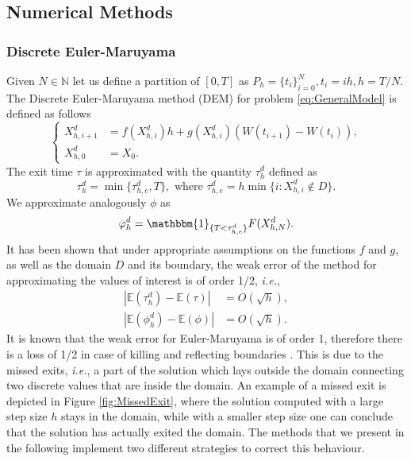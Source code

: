 \subsection{Numerical Methods}

\subsubsection{Discrete Euler-Maruyama}
Given $N \in \mathbb{N}$ let us define a partition of $[0,T]$ as $P_h = \{t_i\}_{i=0}^{N}, t_i = ih, h = T/N$. The Discrete Euler-Maruyama method (DEM) for problem \eqref{eq:GeneralModel} is defined as follows
\begin{equation}\label{eq:DEM}
	\left \{
	\begin{aligned}
		X_{h,i+1}^d &= f(X_{h,i}^d)h + g(X_{h,i}^d)(W(t_{i+1}) - W(t_{i})),  \\
		X_{h,0}^d &= X_0.
	\end{aligned} \right .
\end{equation} 
The exit time $\tau$ is approximated with the quantity $\tau_h^d$ defined as 
\begin{equation}\label{eq:TauDEM}
	\tau_h^d = \min\{\tau_{h,e}^d,T\}, \text{ where } \tau_{h,e}^d = h\min \{i \colon X_{h,i}^d \notin D\}.
\end{equation}
We approximate analogously $\phi$ as
\begin{equation}\label{eq:PhiDEM}
	 \phi_h^d = \mathbbm{1}_{\{T < \tau_{h,e}^d\}}F(X_{h,N}^d).
\end{equation}
It has been shown \cite{Gobet2000, Gobet2010, Higham2013} that under appropriate assumptions on the functions $f$ and $g$, as well as the domain $D$ and its boundary, the weak error of the method for approximating the values of interest is of order 1/2, \textit{i.e.},
\begin{align}\label{eq:ConvDEMTau}
	|\mathbb{E}(\tau_h^d) - \mathbb{E}(\tau)| &= O(\sqrt{h}), \\
	|\mathbb{E}(\phi_h^d) - \mathbb{E}(\phi)| &= O(\sqrt{h}).
\end{align}	
It is known that the weak error for Euler-Maruyama is of order 1, therefore there is a loss of 1/2 in case of killing and reflecting boundaries \cite[Chapter 14]{Kloeden1992}. This is due to the missed exits, \textit{i.e.}, a part of the solution which lays outside the domain connecting two discrete values that are inside the domain. An example of a missed exit is depicted in Figure \ref{fig:MissedExit}, where the solution computed with a large step size $h$ stays in the domain, while with a smaller step size one can conclude that the solution has actually exited the domain. The methods that we present in the following implement two different strategies to correct this behaviour.

